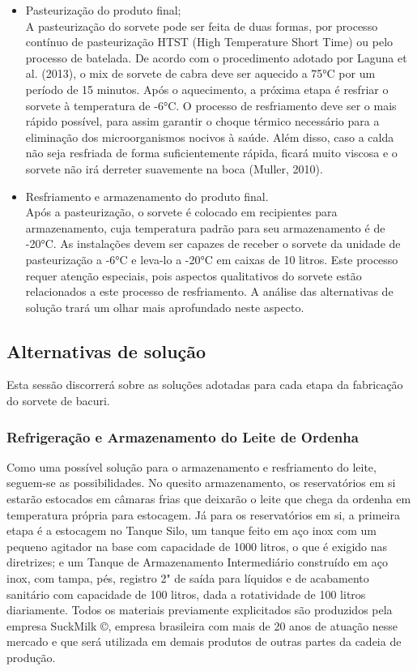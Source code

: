 \documentclass[10pt,a4paper]{article}
\begin{document}
\begin{itemize}
    \item Pasteurização do produto final;\\ 
    A pasteurização do sorvete pode ser feita de duas formas, por processo contínuo de pasteurização HTST (High Temperature Short Time) ou pelo processo de batelada. De acordo com o procedimento adotado por Laguna et al. (2013), o mix de sorvete de cabra deve ser aquecido a 75°C  por um período de 15 minutos. Após o aquecimento, a próxima etapa é resfriar o sorvete à temperatura de -6°C. O processo de resfriamento deve ser o mais rápido possível, para assim garantir o choque térmico necessário para a eliminação dos microorganismos nocivos à saúde. Além disso, caso a calda não seja resfriada de forma suficientemente rápida, ficará muito viscosa e o sorvete não irá derreter suavemente na boca (Muller, 2010).
    \item Resfriamento e armazenamento do produto final.\\
    Após a pasteurização, o sorvete é colocado em recipientes para armazenamento, cuja temperatura padrão para seu armazenamento
    é de -20°C. As instalações devem ser capazes de receber o sorvete da unidade de pasteurização a -6°C e leva-lo a -20°C em caixas de 10 litros. Este processo requer atenção especiais, pois aspectos qualitativos do sorvete estão relacionados a este processo de resfriamento. A análise das alternativas de solução trará um olhar mais aprofundado neste aspecto.
\end{itemize}

\subsection{{ Alternativas de solução}}
Esta sessão discorrerá sobre as soluções adotadas para cada etapa da fabricação do sorvete de bacuri.

\subsubsection{{ Refrigeração e Armazenamento do Leite de Ordenha}}

Como uma possível solução para o armazenamento e resfriamento do leite, seguem-se as possibilidades. No quesito armazenamento, os reservatórios em si estarão estocados em câmaras frias que deixarão o leite que chega da ordenha em temperatura própria para estocagem. Já para os reservatórios em si, a primeira etapa é a estocagem no Tanque Silo, um tanque feito em aço inox com um pequeno agitador na base com capacidade de 1000 litros, o que é exigido nas diretrizes; e um Tanque de Armazenamento Intermediário construído em aço inox, com tampa, pés, registro 2" de saída para líquidos e de acabamento sanitário com capacidade de 100 litros, dada a rotatividade de 100 litros diariamente. Todos os materiais previamente explicitados são produzidos pela empresa SuckMilk ©, empresa brasileira com mais de 20 anos de atuação nesse mercado e que será utilizada em demais produtos de outras partes da cadeia de produção.
\end{document}

